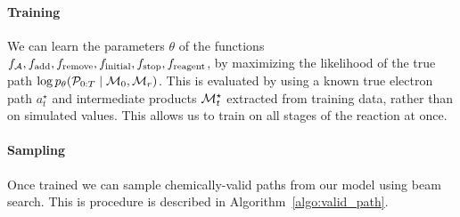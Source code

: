 \paragraph{Training}
We can learn the parameters $\theta$ of the functions $f_{{\mathcal{A}}}, f_{\textrm{add}}, f_{\textrm{remove}}, f_{\textrm{initial}},f_{\textrm{stop}}, f_{\textrm{reagent}}$, by maximizing the likelihood of the true path $\log p_\theta({\mathcal{P}}_{0:T} \mid {\mathcal{M}}_0, {\mathcal{M}}_r)$.
This is evaluated by using a known true electron path $a_t^\star$ and intermediate products ${\mathcal{M}}_t^\star$ extracted from training data,
rather than on simulated values. 
This allows us to train on all stages of the reaction at once.

\paragraph{Sampling}
Once trained we can sample chemically-valid paths from our model using beam search.  This is procedure is described in Algorithm~\ref{algo:valid_path}. 



